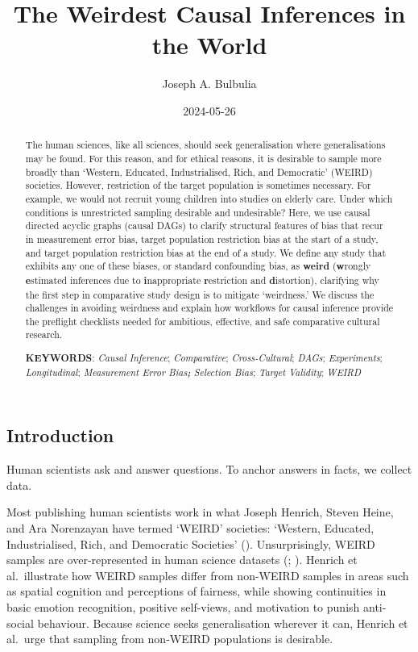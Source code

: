\documentclass[
  single column]{article}
\title{The Weirdest Causal Inferences in the World}
\author{Joseph A. Bulbulia}
\affil{%
             \small{     Victoria University of Wellington, New Zealand
          ORCID \textcolor[HTML]{A6CE39}{\aiOrcid} ~0000-0002-5861-2056 }
              }
\date{2024-05-26}
\begin{document}
\maketitle
\begin{abstract}
The human sciences, like all sciences, should seek generalisation where
generalisations may be found. For this reason, and for ethical reasons,
it is desirable to sample more broadly than `Western, Educated,
Industrialised, Rich, and Democratic' (WEIRD) societies. However,
restriction of the target population is sometimes necessary. For
example, we would not recruit young children into studies on elderly
care. Under which conditions is unrestricted sampling desirable and
undesirable? Here, we use causal directed acyclic graphs (causal DAGs)
to clarify structural features of bias that recur in measurement error
bias, target population restriction bias at the start of a study, and
target population restriction bias at the end of a study. We define any
study that exhibits any one of these biases, or standard confounding
bias, as \textbf{weird} (\textbf{w}rongly \textbf{e}stimated inferences
due to \textbf{i}nappropriate \textbf{r}estriction and
\textbf{d}istortion), clarifying why the first step in comparative study
design is to mitigate `weirdness.' We discuss the challenges in avoiding
weirdness and explain how workflows for causal inference provide the
preflight checklists needed for ambitious, effective, and safe
comparative cultural research.

\textbf{KEYWORDS}: \emph{Causal Inference}; \emph{Comparative};
\emph{Cross-Cultural}; \emph{DAGs}; \emph{Experiments};
\emph{Longitudinal}; \emph{Measurement Error Bias\textbf{; }Selection
Bias}; \emph{Target Validity}; \emph{WEIRD}
\end{abstract}

\subsection{Introduction}\label{id-sec-intro}

Human scientists ask and answer questions. To anchor answers in facts,
we collect data.

Most publishing human scientists work in what Joseph Henrich, Steven
Heine, and Ara Norenzayan have termed `WEIRD' societies: `Western,
Educated, Industrialised, Rich, and Democratic Societies'
().
Unsurprisingly, WEIRD samples are over-represented in human science
datasets (;
). Henrich et al.~illustrate
how WEIRD samples differ from non-WEIRD samples in areas such as spatial
cognition and perceptions of fairness, while showing continuities in
basic emotion recognition, positive self-views, and motivation to punish
anti-social behaviour. Because science seeks generalisation wherever it
can, Henrich et al.~urge that sampling from non-WEIRD populations is
desirable.
\end{document}
